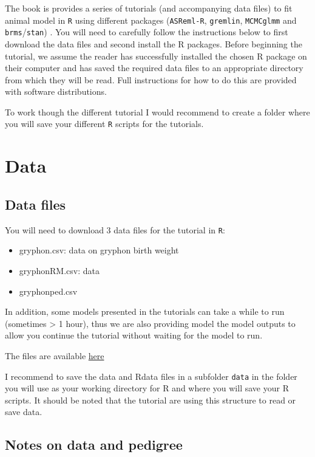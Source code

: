 \documentclass[
  12pt,
]{book}
\providecommand{\tightlist}{%
  \setlength{\itemsep}{0pt}\setlength{\parskip}{0pt}}
\begin{document}
The book is provides a series of tutorials (and accompanying data files) to fit animal model in \texttt{R} using different packages (\texttt{ASReml-R}, \texttt{gremlin}, \texttt{MCMCglmm} and \texttt{brms}/\texttt{stan}) .
You will need to carefully follow the instructions below to first download the data files and second install the R packages.
Before beginning the tutorial, we assume the reader has successfully installed the chosen R package on their computer and has saved the required data files to an appropriate directory from which they will be read.
Full instructions for how to do this are provided with software distributions.

To work though the different tutorial I would recommend to create a folder where you will save your different \texttt{R} scripts for the tutorials.

\hypertarget{data}{%
\section{Data}\label{data}}

\hypertarget{data-files}{%
\subsection{Data files}\label{data-files}}

You will need to download 3 data files for the tutorial in \texttt{R}:

\begin{itemize}
\tightlist
\item
  gryphon.csv: data on gryphon birth weight
\item
  gryphonRM.csv: data
\item
  gryphonped.csv
\end{itemize}

In addition, some models presented in the tutorials can take a while to run (sometimes \textgreater{} 1 hour), thus we are also providing model the model outputs to allow you continue the tutorial without waiting for the model to run.

The files are available \href{https://github.com/JulienGAMartin/wam_tuto/tree/master/data}{here}

I recommend to save the data and Rdata files in a subfolder \texttt{data} in the folder you will use as your working directory for R and where you will save your R scripts. It should be noted that the tutorial are using this structure to read or save data.

\hypertarget{notes-on-data-and-pedigree}{%
\subsection{Notes on data and pedigree}\label{notes-on-data-and-pedigree}}
\end{document}
